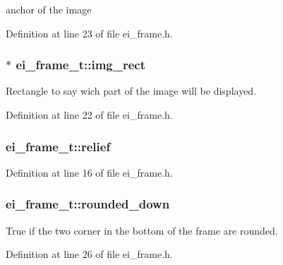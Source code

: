 anchor of the image 



Definition at line 23 of file ei\+\_\+frame.\+h.

\hypertarget{structei__frame__t_a6758a232474fa8b8469ecbc92c699f15}{
\subsubsection[{img\+\_\+rect}]{$\ast$ ei\+\_\+frame\+\_\+t\+::img\+\_\+rect}}\label{structei__frame__t_a6758a232474fa8b8469ecbc92c699f15}


Rectangle to say wich part of the image will be displayed. 



Definition at line 22 of file ei\+\_\+frame.\+h.

\hypertarget{structei__frame__t_a4d0e33d09e4119629f4fa13107b4a9f3}{
\subsubsection[{relief}]{ ei\+\_\+frame\+\_\+t\+::relief}}\label{structei__frame__t_a4d0e33d09e4119629f4fa13107b4a9f3}


Definition at line 16 of file ei\+\_\+frame.\+h.

\hypertarget{structei__frame__t_a38fd04cba482eb2db2705afd10f2060f}{
\subsubsection[{rounded\+\_\+down}]{ ei\+\_\+frame\+\_\+t\+::rounded\+\_\+down}}\label{structei__frame__t_a38fd04cba482eb2db2705afd10f2060f}


True if the two corner in the bottom of the frame are rounded. 



Definition at line 26 of file ei\+\_\+frame.\+h.

